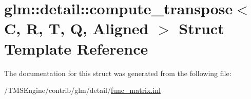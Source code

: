 \hypertarget{structglm_1_1detail_1_1compute__transpose}{}\section{glm\+:\+:detail\+:\+:compute\+\_\+transpose$<$ C, R, T, Q, Aligned $>$ Struct Template Reference}
\label{structglm_1_1detail_1_1compute__transpose}


The documentation for this struct was generated from the following file\+:\begin{DoxyCompactItemize}
\item 
/\+T\+M\+S\+Engine/contrib/glm/detail/\hyperlink{func__matrix_8inl}{func\+\_\+matrix.\+inl}\end{DoxyCompactItemize}

